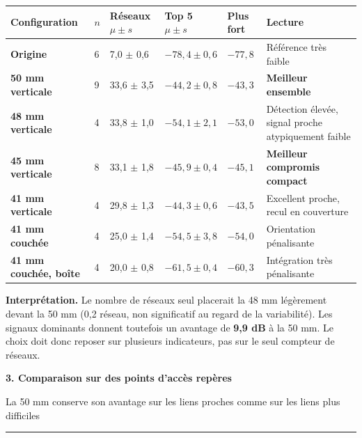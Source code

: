 \documentclass[10pt,a4paper]{article}
\newcommand{\sectiontitle}[2]{%
  {\color{navy}\fontsize{19}{21}\selectfont\bfseries #1}\par
  {\color{muted}\small #2}\par\vspace{4pt}
  {\color{cyan}\rule{19mm}{2pt}}\vspace{5pt}
}
\begin{document}
\vspace{3mm}
\begin{tabularx}{\textwidth}{>{\bfseries}l C{13mm} C{24mm} C{23mm} C{20mm} Y}
\toprule
Configuration & \(n\) & Réseaux \(\mu\pm s\) & Top 5 \(\mu\pm s\) & Plus fort & Lecture \\
\midrule
Origine & 6 & 7,0 $\pm$ 0,6 & $-78,4\pm0,6$ & $-77,8$ & Référence très faible \\
 50 mm verticale & 9 & 33,6 $\pm$ 3,5 & $-44,2\pm0,8$ & $-43,3$ & \textbf{Meilleur ensemble} \\
48 mm verticale & 4 & 33,8 $\pm$ 1,0 & $-54,1\pm2,1$ & $-53,0$ & Détection élevée, signal proche atypiquement faible \\
45 mm verticale & 8 & 33,1 $\pm$ 1,8 & $-45,9\pm0,4$ & $-45,1$ & \textbf{Meilleur compromis compact} \\
41 mm verticale & 4 & 29,8 $\pm$ 1,3 & $-44,3\pm0,6$ & $-43,5$ & Excellent proche, recul en couverture \\
41 mm couchée & 4 & 25,0 $\pm$ 1,4 & $-54,5\pm3,8$ & $-54,0$ & Orientation pénalisante \\
41 mm couchée, boîte & 4 & 20,0 $\pm$ 0,8 & $-61,5\pm0,4$ & $-60,3$ & Intégration très pénalisante \\
\bottomrule
\end{tabularx}

\vspace{4mm}
\begin{decisionbox}
\textbf{Interprétation.} Le nombre de réseaux seul placerait la 48 mm légèrement devant la 50 mm (0,2 réseau, non significatif au regard de la variabilité). Les signaux dominants donnent toutefois un avantage de \textbf{9,9 dB} à la 50 mm. Le choix doit donc reposer sur plusieurs indicateurs, pas sur le seul compteur de réseaux.
\end{decisionbox}
\newpage

\sectiontitle{3. Comparaison sur des points d'accès repères}{La 50 mm conserve son avantage sur les liens proches comme sur les liens plus difficiles}
\end{document}
